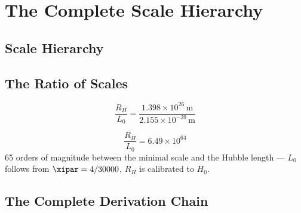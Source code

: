 \section{The Complete Scale Hierarchy}

\subsection{Scale Hierarchy}

\begin{table}[h]
\centering
{}
\caption{Scale hierarchy in $\xipar$-notation (cosmological scale $R_H$ calibrated to $H_0$)}
\end{table}

\subsection{The Ratio of Scales}

\begin{equation}
	\frac{R_H}{L_0} = \frac{1{.}398 \times 10^{26}\,\text{m}}{2{.}155 \times 10^{-39}\,\text{m}}
\end{equation}

\begin{keyresult}
\begin{equation}
	\boxed{\frac{R_H}{L_0} = 6{.}49 \times 10^{64}}
\end{equation}
65 orders of magnitude between the minimal scale and the Hubble length — $L_0$ follows from $\xipar = 4/30000$, $R_H$ is calibrated to $H_0$.
\end{keyresult}

\subsection{The Complete Derivation Chain}

